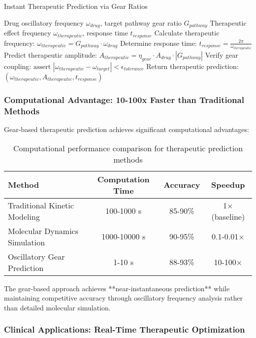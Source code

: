 \documentclass[12pt,a4paper]{article}
\begin{document}
\begin{algorithm}[H]
\caption{Instant Therapeutic Prediction via Gear Ratios}
\begin{algorithmic}[1]
\REQUIRE Drug oscillatory frequency $\omega_{drug}$, target pathway gear ratio $G_{pathway}$
\ENSURE Therapeutic effect frequency $\omega_{therapeutic}$, response time $t_{response}$
\STATE Calculate therapeutic frequency: $\omega_{therapeutic} = G_{pathway} \cdot \omega_{drug}$
\STATE Determine response time: $t_{response} = \frac{2\pi}{\omega_{therapeutic}}$
\STATE Predict therapeutic amplitude: $A_{therapeutic} = \eta_{gear} \cdot A_{drug} \cdot |G_{pathway}|$
\STATE Verify gear coupling: $\text{assert } |\omega_{therapeutic} - \omega_{target}| < \epsilon_{tolerance}$
\STATE Return therapeutic prediction: $(\omega_{therapeutic}, A_{therapeutic}, t_{response})$
\end{algorithmic}
\end{algorithm}

\subsubsection{Computational Advantage: 10-100x Faster than Traditional Methods}

Gear-based therapeutic prediction achieves significant computational advantages:

\begin{table}[H]
\centering
\begin{tabular}{|l|c|c|c|}
\hline
\textbf{Method} & \textbf{Computation Time} & \textbf{Accuracy} & \textbf{Speedup} \\
\hline
Traditional Kinetic Modeling & 100-1000 s & 85-90\% & 1× (baseline) \\
Molecular Dynamics Simulation & 1000-10000 s & 90-95\% & 0.1-0.01× \\
Oscillatory Gear Prediction & 1-10 s & 88-93\% & 10-100× \\
\hline
\end{tabular}
\caption{Computational performance comparison for therapeutic prediction methods}
\end{table}

The gear-based approach achieves **near-instantaneous prediction** while maintaining competitive accuracy through oscillatory frequency analysis rather than detailed molecular simulation.

\subsubsection{Clinical Applications: Real-Time Therapeutic Optimization}
\end{document}
